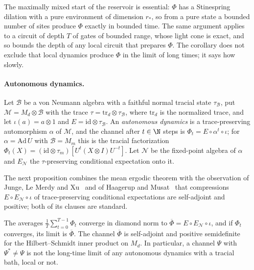 The maximally mixed start of the reservoir is essential: $\Phi$ has a Stinespring dilation with a pure environment of dimension $r_*$, so
from a pure state a bounded number of sites produce $\Phi$ exactly in bounded time. The same argument applies to a circuit of depth $T$ of gates of
bounded range, whose light cone is exact, and so bounds the depth of any local
circuit that prepares $\Phi$. The corollary does not exclude that local dynamics produce $\Phi$ in the limit of long times; it says how slowly.

\paragraph{Autonomous dynamics.} Let $\mathcal B$ be a von Neumann algebra with a faithful normal tracial state $\tau_{\mathcal B}$, put
$\mathcal M=M_d\otimes\mathcal B$ with the trace $\tau=\mathrm{tr}_d\otimes\tau_{\mathcal B}$, where $\mathrm{tr}_d$ is the normalized trace, and let
$\iota(a)=a\otimes1$ and $E=\mathrm{id}\otimes\tau_{\mathcal B}$. An \emph{autonomous dynamics} is a trace-preserving automorphism $\alpha$ of $\mathcal M$,
and the channel after $t\in\N$ steps is $\Phi_t=E\circ\alpha^t\circ\iota$; for $\alpha=\mathrm{Ad}\,U$ with $\mathcal B=M_m$ this is the tracial
factorization $\Phi_t(X)=(\mathrm{id}\otimes\tau_m)[U^t(X\otimes I)U^{-t}]$. Let $\mathcal N$ be the fixed-point algebra of $\alpha$ and
$E_{\mathcal N}$ the $\tau$-preserving conditional expectation onto it.

The next proposition combines the mean ergodic theorem with the observation of Junge, Le Merdy and Xu~\cite[Remark~10.3]{JungeLeMerdyXu2006}
and of Haagerup and Musat~\cite[Remark~5.2]{HaagerupMusat2011} that compressions $E\circ E_{\mathcal N}\circ\iota$ of trace-preserving conditional
expectations are self-adjoint and positive; both of its clauses are standard.

\begin{proposition}\label{prop:autonomous}
The averages $\frac1T\sum_{t=0}^{T-1}\Phi_t$ converge in diamond norm to $\overline\Phi=E\circ E_{\mathcal N}\circ\iota$, and if $\Phi_t$ converges, its
limit is $\overline\Phi$. The channel $\overline\Phi$ is self-adjoint and positive semidefinite for the Hilbert--Schmidt inner product on $M_d$. In
particular, a channel $\Psi$ with $\Psi^*\ne\Psi$ is not the long-time limit of any autonomous dynamics with a tracial bath, local or not.
\end{proposition}

